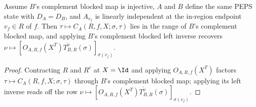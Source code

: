 \begin{lemma}
    \label{thm:peps_region_first_coeff_second_complement_block}
    \leanok
    Assume $B$'s complement blocked map is injective, $A$ and $B$ define the same PEPS state with $D_A=D_B$, and $A_{v_f}$ is linearly independent at the in-region endpoint $v_f\in R$ of $f$. Then $\tau\mapsto C_A(R,f,X;\sigma,\tau)$ lies in the range of $B$'s complement blocked map, and applying $B$'s complement blocked left inverse recovers $\nu\mapsto[O_{A,R,f}(X^T)T_{B,R}^{\widetilde{\nu}}(\sigma)]_{\sigma(v_f)}$.
\end{lemma}
\begin{proof}\leanok
    Contracting $R$ and $R^c$ at $X=\Id$ and applying $O_{A,R,f}(X^T)$ factors $\tau\mapsto C_A(R,f,X;\sigma,\tau)$ through $B$'s complement blocked map; applying its left inverse reads off the row $\nu\mapsto[O_{A,R,f}(X^T)T_{B,R}^{\widetilde{\nu}}(\sigma)]_{\sigma(v_f)}$.
\end{proof}

